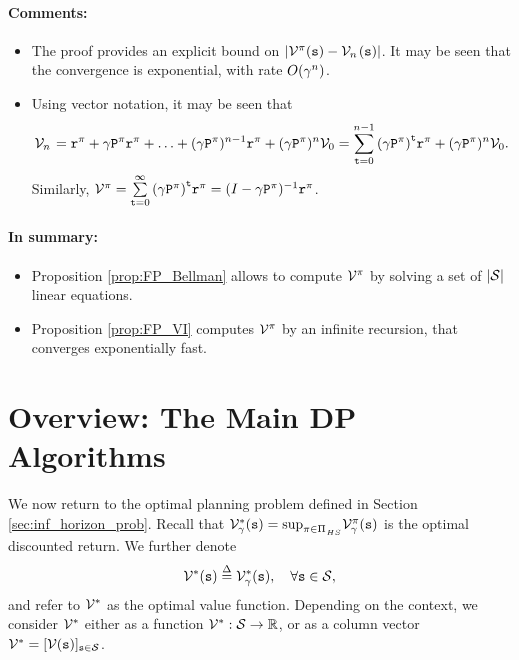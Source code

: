 \paragraph{Comments:}
\begin{itemize}
  \item The proof provides an explicit bound on $|{\mathcal{V}^\pi }({\tt s}) - {\mathcal{V}_n}{\kern 1pt} ({\tt s})|$. It may be seen that the convergence is exponential, with rate $O({\gamma ^n})$.
  \item Using vector notation, it may be seen that
          \[{\mathcal{V}_n}{\kern 1pt}  = {{\tt r}^\pi } + \gamma{{\tt P}^\pi}{{\tt r}^\pi} +  \ldots  + {(\gamma{{\tt P}^\pi})^{n - 1}}{{\tt r}^\pi } + {(\gamma{{\tt P}^\pi})^n}{\mathcal{V}_0} = \sum\limits_{{\tt t} = 0}^{n - 1} {{{(\gamma{{\tt P}^\pi})}^{\tt t}}{{\tt r}^\pi }}  + {(\gamma{{\tt P}^\pi})^n}{\mathcal{V}_0}.\]
Similarly,    ${\mathcal{V}^\pi } = \sum\limits_{{\tt t} = 0}^\infty
{{{(\gamma{{\tt P}^\pi})}^{\tt t}}{{\tt r}^\pi}} = {(I - \gamma {{\tt P}^\pi})^{ -
1}}{{\tt r}^\pi }$.
\end{itemize}

\paragraph{In summary:}
\begin{itemize}
  \item Proposition \ref{prop:FP_Bellman} allows to compute $\mathcal{V}_{}^\pi $ by solving a set of $|\mathcal{S}|$ linear equations.
  \item Proposition \ref{prop:FP_VI} computes $\mathcal{V}_{}^\pi $ by an infinite recursion, that converges exponentially fast.
\end{itemize}

\section{Overview: The Main DP Algorithms}

We now return to the optimal planning problem defined in Section
\ref{sec:inf_horizon_prob}. Recall that  $\mathcal{V}_\gamma
^*({\tt s}) = {\sup _{\pi  \in \Pi }}_{_{HS}}\mathcal{V}_\gamma
^\pi ({\tt s})$ is the optimal discounted return. We further
denote
\[{\Value^*}(\state) \buildrel \Delta \over = \Value_\discount ^*(\state),    \quad  \forall \state \in \States,\]
and refer to ${\mathcal{V}^*}$ as the optimal value function. Depending
on the context, we consider ${\mathcal{V}^*}$ either as a function
$\mathcal{V}^* : \mathcal{S} \to \mathbb R$, or as a column vector
${\mathcal{V}^*} = {[\mathcal{V}({\tt s})]_{{\tt s} \in \mathcal{S}}}$.

